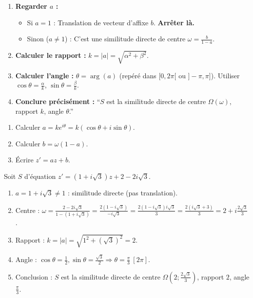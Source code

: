 \documentclass[11pt]{article}
\begin{document}
\begin{methode}[D\'eterminer la nature et les \'el\'ements de $z'=az+b$]
\begin{enumerate}
\item \textbf{Regarder $a$ :}
      \begin{itemize}
      \item Si $a=1$ : Translation de vecteur d'affixe $b$. \textbf{Arr\^eter l\`a.}
      \item Sinon ($a \neq 1$) : C'est une similitude directe de centre $\omega = \frac{b}{1-a}$.
      \end{itemize}
\item \textbf{Calculer le rapport :} $k = |a| = \sqrt{\alpha^2+\beta^2}$.
\item \textbf{Calculer l'angle :} $\theta = \arg(a)$ (rep\'er\'e dans $[0, 2\pi[$ ou $]-\pi,\pi]$). Utiliser $\cos\theta = \frac{\alpha}{k}$, $\sin\theta = \frac{\beta}{k}$.
\item \textbf{Conclure pr\'ecis\'ement :} ``$S$ est la similitude directe de centre $\Omega(\omega)$, rapport $k$, angle $\theta$.''
\end{enumerate}
\end{methode}

\begin{methode}
\begin{enumerate}
\item Calculer $a = k e^{i\theta} = k(\cos\theta + i\sin\theta)$.
\item Calculer $b = \omega(1-a)$.
\item \'Ecrire $z' = az + b$.
\end{enumerate}
\end{methode}

\begin{exemplebox}
Soit $S$ d'\'equation $z' = (1+i\sqrt{3})z + 2-2i\sqrt{3}$.
\begin{enumerate}
\item $a = 1+i\sqrt{3} \neq 1$ : similitude directe (pas translation).
\item Centre : $\omega = \frac{2-2i\sqrt{3}}{1-(1+i\sqrt{3})} = \frac{2(1-i\sqrt{3})}{-i\sqrt{3}} = \frac{2(1-i\sqrt{3})i\sqrt{3}}{3} = \frac{2(i\sqrt{3}+3)}{3} = 2 + i\frac{2\sqrt{3}}{3}$.
\item Rapport : $k = |a| = \sqrt{1^2+(\sqrt{3})^2} = 2$.
\item Angle : $\cos\theta = \frac{1}{2}, \sin\theta = \frac{\sqrt{3}}{2} \Rightarrow \theta = \frac{\pi}{3}\ [2\pi]$.
\item Conclusion : $S$ est la similitude directe de centre $\Omega\left(2;\frac{2\sqrt{3}}{3}\right)$, rapport $2$, angle $\frac{\pi}{3}$.
\end{enumerate}
\end{exemplebox}
\end{document}
